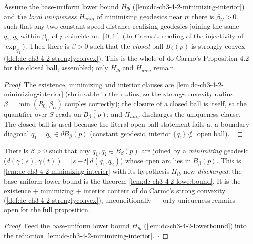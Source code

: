 \begin{lemma}
  \label{lem:dc-ch3-4-2-stronglyconvex-reduction}
  \leanok
  Assume the base-uniform lower bound $H_{lb}$ (\cref{lem:dc-ch3-4-2-minimizing-interior}) and the
  \emph{local uniqueness} $H_{uniq}$ of minimizing geodesics near $p$: there is $\beta_U>0$ such that
  any two constant-speed distance-realizing geodesics joining the same $q_1,q_2$ within $\beta_U$ of
  $p$ coincide on $[0,1]$ (do Carmo's reading of the injectivity of $\exp_{q_1}$). Then there is
  $\beta>0$ such that the \emph{closed} ball $\overline{B_\beta(p)}$ is strongly convex
  (\cref{def:dc-ch3-4-2-stronglyconvex}). This is the whole of do Carmo's Proposition 4.2 for the
  closed ball, assembled; only $H_{lb}$ and $H_{uniq}$ remain.
\end{lemma}
\begin{proof}
  \leanok
  The existence, minimizing and interior clauses are \cref{lem:dc-ch3-4-2-minimizing-interior}
  (shrinkable in the radius, so the strong-convexity radius $\beta=\min(B_0,\beta_U)$ couples
  correctly); the closure of a closed ball is itself, so the quantifier over $\overline{S}$ reads on
  $\overline{B_\beta(p)}$; and $H_{uniq}$ discharges the uniqueness clause. The closed ball is used
  because the literal open-ball statement fails at a boundary diagonal $q_1=q_2\in\partial B_\beta(p)$
  (constant geodesic, interior $\{q_1\}\not\subset$ open ball). $\square$
\end{proof}

\begin{lemma}
  \label{lem:dc-ch3-4-2-minimizing-interior-uncond}
  \leanok
  There is $\beta>0$ such that any $q_1,q_2\in\overline{B_\beta(p)}$ are joined by a \emph{minimizing}
  geodesic ($d(\gamma(s),\gamma(t))=|s-t|\,d(q_1,q_2)$) whose open arc lies in $\overline{B_\beta(p)}$.
  This is \cref{lem:dc-ch3-4-2-minimizing-interior} with its hypothesis $H_{lb}$ now
  \emph{discharged}: the base-uniform lower bound is the theorem
  \cref{lem:dc-ch3-4-2-lowerbound}. It is the existence + minimizing + interior content of do Carmo's
  strong convexity (\cref{def:dc-ch3-4-2-stronglyconvex}), unconditionally --- only uniqueness remains
  open for the full proposition.
\end{lemma}
\begin{proof}
  \leanok
  Feed the base-uniform lower bound $H_{lb}$ (\cref{lem:dc-ch3-4-2-lowerbound}) into the reduction
  \cref{lem:dc-ch3-4-2-minimizing-interior}. $\square$
\end{proof}

